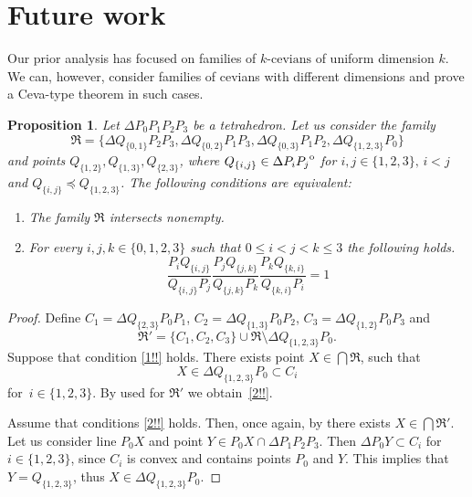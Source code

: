 \documentclass[12pt, reqno]{amsart}
\newtheorem{proposition}[theorem]{Proposition}
\theoremstyle{definition}
\theoremstyle{remark}
\numberwithin{equation}{section}
\newcommand{\interior}[1]{%
  {\kern0pt#1}^{\mathrm{o}}%
}
\begin{document}
{\section{Future work}
Our prior analysis has focused on families of $k\mbox{-cevians}$ of uniform dimension $k$. We can, however, consider families of cevians with different dimensions and prove a Ceva-type theorem in such cases.

\begin{proposition}\label{prop}
    Let $\Delta P_0P_1P_2P_3$ be a tetrahedron. Let us consider the family 
    \[
    \mathfrak{R}=\{\Delta Q_{\{0,1\}}P_2P_3, \Delta Q_{\{0,2\}}P_1P_3, \Delta Q_{\{0,3\}}P_1P_2, \Delta Q_{\{1,2,3\}}P_0\}
    \]
    and points $Q_{\{1,2\}},Q_{\{1,3\}},Q_{\{2,3\}}$, where $Q_{\{i,j\}}\in \interior{\Delta P_iP_j}$ for $i,j\in \{1,2,3\}\mbox{, }i<j$ and $Q_{\{i,j\}}\preceq Q_{\{1,2,3\}}$. The following conditions are equivalent:
    \begin{enumerate}
        \item \label{1!!} The family $\mathfrak{R}$ intersects nonempty.
        \item \label{2!!} For every $i,j,k\in\{0,1,2,3\}$ such that $0\leq i<j<k\leq 3$ the following holds.
        \[
        \frac{P_iQ_{\{i,j\}}}{Q_{\{i,j\}}P_j}
        \frac{P_jQ_{\{j,k\}}}{Q_{\{j,k\}}P_k}
        \frac{P_kQ_{\{k,i\}}}{Q_{\{k,i\}}P_i}=1
        \]
    \end{enumerate}
\end{proposition}
    \begin{proof}
        Define $C_1=\Delta Q_{\{2,3\}}P_0P_1$, $C_2=\Delta Q_{\{1,3\}}P_0P_2$, $C_3=\Delta Q_{\{1,2\}}P_0P_3$ and
        \[
        \mathfrak{R'}=\{C_1,C_2,C_3\}\cup \mathfrak{R} \setminus \Delta Q_{\{1,2,3\}}P_0.
        \]
        Suppose that condition \eqref{1!!} holds. There exists point $X\in\bigcap\mathfrak{R}$, such that
        \[
        X\in \Delta Q_{\{1,2,3\}}P_0\subset C_i
        \]
        for~$i\in\{1,2,3\}$. By \cite[Theorem~1]{Buba-Brzozowa} used for $\mathfrak{R'}$ we obtain~\ref{2!!}.

        Assume that conditions \eqref{2!!} holds. Then, once again, by \cite[Theorem~1]{Buba-Brzozowa} there exists $X\in\bigcap\mathfrak{R'}$. Let us consider line $P_0X$ and point $Y\in P_0X\cap \Delta P_1P_2P_3$. Then $\Delta P_0Y\subset C_i$ for $i\in \{1,2,3\}$, since $C_i$ is convex and contains points $P_0$ and $Y$. This implies that $Y=Q_{\{1,2,3\}}$, thus $X\in \Delta Q_{\{1,2,3\}}P_0.$
    \end{proof}
    
}
\end{document}
